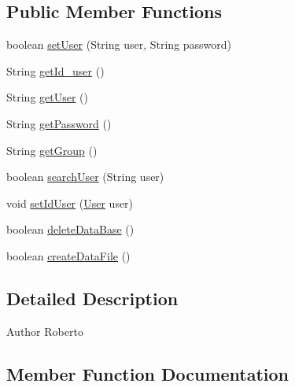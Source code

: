 \subsection*{Public Member Functions}
\begin{DoxyCompactItemize}
\item 
boolean \hyperlink{classcom_1_1eneri_1_1scorpio__metertool_1_1database_1_1_user_a0c4c1bf6ede083f317ce55d26bd1cf14}{set\+User} (String user, String password)
\item 
String \hyperlink{classcom_1_1eneri_1_1scorpio__metertool_1_1database_1_1_user_a44c0d0dbe3e9c399faa2a4dafaf36cc7}{get\+Id\+\_\+user} ()
\item 
String \hyperlink{classcom_1_1eneri_1_1scorpio__metertool_1_1database_1_1_user_a6fcb3029af41a67d2743d265e1338555}{get\+User} ()
\item 
String \hyperlink{classcom_1_1eneri_1_1scorpio__metertool_1_1database_1_1_user_aadaa17fb5ba2580f37f41d3ccf468751}{get\+Password} ()
\item 
String \hyperlink{classcom_1_1eneri_1_1scorpio__metertool_1_1database_1_1_user_a810adb480eac98212e51fda67e0483ad}{get\+Group} ()
\item 
boolean \hyperlink{classcom_1_1eneri_1_1scorpio__metertool_1_1database_1_1_user_af54e0e732f22bcdc11f5a31af12e2f43}{search\+User} (String user)
\item 
void \hyperlink{classcom_1_1eneri_1_1scorpio__metertool_1_1database_1_1_user_a391dd63fdea25b31f07522bf63920cfe}{set\+Id\+User} (\hyperlink{classcom_1_1eneri_1_1scorpio__metertool_1_1database_1_1_user}{User} user)
\item 
boolean \hyperlink{classcom_1_1eneri_1_1scorpio__metertool_1_1database_1_1_user_a20710ba6e9171d736f15dd07d7008a0a}{delete\+Data\+Base} ()
\item 
boolean \hyperlink{classcom_1_1eneri_1_1scorpio__metertool_1_1database_1_1_user_a62466f9a50d01cb0422ef19e3dbf7052}{create\+Data\+File} ()
\end{DoxyCompactItemize}


\subsection{Detailed Description}
\begin{DoxyAuthor}{Author}
Roberto 
\end{DoxyAuthor}


\subsection{Member Function Documentation}
\mbox{\label{classcom_1_1eneri_1_1scorpio__metertool_1_1database_1_1_user_a62466f9a50d01cb0422ef19e3dbf7052}} 
